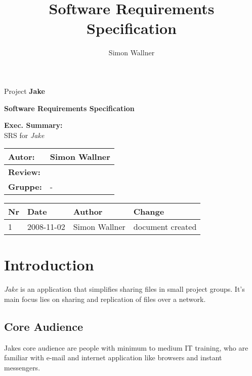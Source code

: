 \documentclass[english,a4paper,12pt]{report}
\newcommand{\tblheader}[1]{\textbf{#1}}
\begin{document}
\title{ Software Requirements Specification } 
\author{Simon Wallner}
\pagestyle{fancy}
\cfoot{\number\year-\number\month-\number\day}
\rfoot{\thepage/\pageref{LastPage}}

\begin{titlepage}
\begin{center}
\LARGE{Project \textbf{Jake}}

\vfill
\Huge{\textbf{Software Requirements Specification}}
\end{center}

\vspace{2cm}
\textbf{Exec. Summary:} \\
SRS for \emph{Jake}

\vfill
\begin{tabular}{ | l | l | }
\hline
 \tblheader{Autor:} & Simon Wallner \\
\hline
 \tblheader{Review:} & \\
\hline
 \tblheader{Gruppe:} & - \\
\hline
\end{tabular}

\vspace{2cm}

\begin{tabular}{ | l | l | p{3.5cm} | p{7cm} | }
\hline
  \tblheader{Nr} & \tblheader{Date} & \tblheader{Author} & \tblheader{Change} \\
\hline
1 & 2008-11-02 & Simon Wallner & document created \\
\hline

\end{tabular}
\thispagestyle{empty}
\end{titlepage}

\tableofcontents
\thispagestyle{fancy}
\clearpage

\pagestyle{fancy}

\section{Introduction}
\emph{Jake} is an application that simplifies sharing files in small project groups. It's main focus lies on sharing and replication of files over a network.

\subsection{Core Audience}
Jakes core audience are people with minimum to medium IT training, who are familiar with e-mail and internet application like browsers and instant messengers. 
\end{document}
